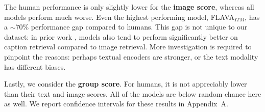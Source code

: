 \documentclass[10pt,twocolumn,letterpaper]{article}
\begin{document}
The human performance is only slightly lower for the \textbf{image score}, whereas all models perform much worse. Even the highest performing model, FLAVA$_{ITM}$, has a $\sim$70\% performance gap compared to humans. This gap is not unique to our dataset: in prior work \cite{faghri2018vse} \cite{radford2021clip}, models also tend to perform significantly better on caption retrieval compared to image retrieval. More investigation is required to pinpoint the reasons: perhaps textual encoders are stronger, or the text modality has different biases.

Lastly, we consider the \textbf{group score}. For humans, it is not appreciably lower than their text and image scores. All of the models are below random chance here as well.
We report confidence intervals for these results in Appendix~A.
\end{document}
